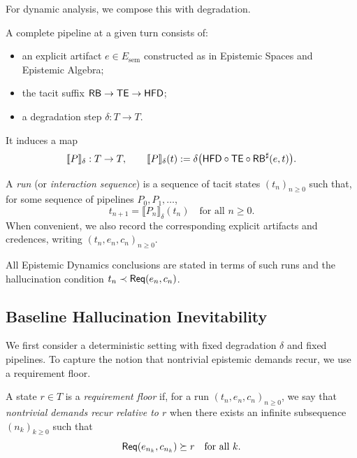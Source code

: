 For dynamic analysis, we compose this with degradation.

\begin{definition}
A complete pipeline at a given turn consists of:
\begin{itemize}[leftmargin=2em]
  \item an explicit artifact \(e \in E_{\mathrm{sem}}\) constructed as in
        Epistemic Spaces and Epistemic Algebra;
  \item the tacit suffix \(\mathsf{RB} \to \mathsf{TE} \to \mathsf{HFD}\);
  \item a degradation step \(\delta:T\to T\).
\end{itemize}
It induces a map
\[
\llbracket P \rrbracket_\delta : T \to T,\qquad
\llbracket P \rrbracket_\delta(t)
 :=
 \delta\bigl(\mathsf{HFD}\circ\mathsf{TE}\circ\mathsf{RB}^{\sharp}(e,t)\bigr).
\]
\end{definition}

\begin{definition}[Run]
A \emph{run} (or \emph{interaction sequence}) is a sequence of tacit
states \((t_n)_{n\ge 0}\) such that, for some sequence of pipelines
\(P_0,P_1,\dots\),
\[
t_{n+1} = \llbracket P_n \rrbracket_\delta(t_n)
\quad\text{for all } n\ge 0.
\]
When convenient, we also record the corresponding explicit artifacts and
credences, writing \((t_n,e_n,c_n)_{n\ge 0}\).
\end{definition}

All Epistemic Dynamics conclusions are stated in terms of such runs and the
hallucination condition \(t_n \prec \mathsf{Req}(e_n,c_n)\).

\subsection{Baseline Hallucination Inevitability}

We first consider a deterministic setting with fixed degradation
\(\delta\) and fixed pipelines. To capture the notion that nontrivial
epistemic demands recur, we use a requirement floor.

\begin{definition}
A state \(r\in T\) is a \emph{requirement floor} if, for a run
\((t_n,e_n,c_n)_{n\ge 0}\), we say that \emph{nontrivial demands recur
relative to \(r\)} when there exists an infinite subsequence
\((n_k)_{k\ge 0}\) such that
\[
\mathsf{Req}(e_{n_k},c_{n_k}) \succeq r
\quad\text{for all }k.
\]
\end{definition}


